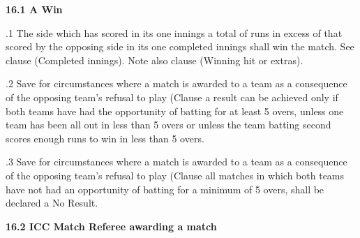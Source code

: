 \documentclass[12pt]{article}
\begin{document}
\vspace{\baselineskip}
{\fontsize{11pt}{13.2pt}\selectfont \textbf{16.1 \tabto{0.47in} A Win}\par}\par


\vspace{\baselineskip}
\begin{adjustwidth}{0.5in}{0.1in}
\begin{justify}
{\fontsize{9pt}{10.8pt}.1 \tabto{0.49in} The side which has scored in its one innings a total of runs in excess of that scored by the opposing side in its one completed innings shall win the match. See clause (Completed innings). Note also clause  (Winning hit or extras).\par}
\end{justify}\par

\end{adjustwidth}


\vspace{\baselineskip}
\begin{adjustwidth}{0.5in}{0.04in}
{\fontsize{9pt}{10.8pt}.2 \tabto{0.49in} Save for circumstances where a match is awarded to a team as a consequence of the opposing team’s refusal to play (Clause a result can be achieved only if both teams have had the opportunity of batting for at least 5 overs, unless one team has been all out in less than 5 overs or unless the team batting second scores enough runs to win in less than 5 overs.\par}\par

\end{adjustwidth}


\vspace{\baselineskip}
\begin{adjustwidth}{0.5in}{0.18in}
{\fontsize{9pt}{10.8pt}.3 \tabto{0.49in} Save for circumstances where a match is awarded to a team as a consequence of the opposing team’s refusal to play (Clause all matches in which both teams have not had an opportunity of batting for a minimum of 5 overs, shall be declared a No Result.\par}\par

\end{adjustwidth}


\vspace{\baselineskip}
{\fontsize{11pt}{13.2pt}\selectfont \textbf{16.2 \tabto{0.47in} ICC Match Referee awarding a match}\par}\par
\end{document}
